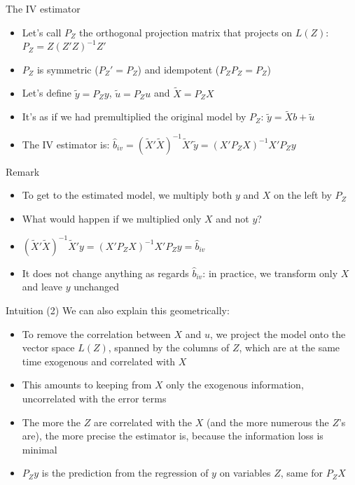 \documentclass[aspectratio=169]{beamer}
\begin{document}
\begin{frame}{The IV estimator}
\begin{itemize}
    \item Let's call $P_Z$ the orthogonal projection matrix that projects on $L(Z)$: $P_Z = Z(Z'Z)^{-1}Z'$
    \item $P_Z$ is symmetric ($P_Z' = P_Z$) and idempotent ($P_ZP_Z = P_Z$)
    \item Let's define $\tilde{y} = P_Zy$, $\tilde{u} = P_Zu$ and $\tilde{X} = P_ZX$
    \item It's as if we had premultiplied the original model by $P_Z$: $\tilde{y} = \tilde{X}b + \tilde{u}$
    \item The IV estimator is: $\hat{b}_{iv} = (\tilde{X}'\tilde{X})^{-1}\tilde{X}'\tilde{y} = (X'P_ZX)^{-1}X'P_Zy$
\end{itemize}
\end{frame}

\begin{frame}{Remark}
\begin{itemize}
    \item To get to the estimated model, we multiply both $y$ and $X$ on the left by $P_Z$
    \item What would happen if we multiplied only $X$ and not $y$?
    \item $(\tilde{X}'\tilde{X})^{-1}\tilde{X}'y = (X'P_ZX)^{-1}X'P_Zy = \hat{b}_{iv}$
    \item It does not change anything as regards $\hat{b}_{iv}$: in practice, we transform only $X$ and leave $y$ unchanged
\end{itemize}
\end{frame}

\begin{frame}{Intuition (2)}
We can also explain this geometrically:
\begin{itemize}
    \item To remove the correlation between $X$ and $u$, we project the model onto the vector space $L(Z)$, spanned by the columns of $Z$, which are at the same time exogenous and correlated with $X$
    \item This amounts to keeping from $X$ only the exogenous information, uncorrelated with the error terms
    \item The more the $Z$ are correlated with the $X$ (and the more numerous the $Z$'s are), the more precise the estimator is, because the information loss is minimal
    \item $P_Zy$ is the prediction from the regression of $y$ on variables $Z$, same for $P_ZX$
\end{itemize}
\end{frame}
\end{document}
